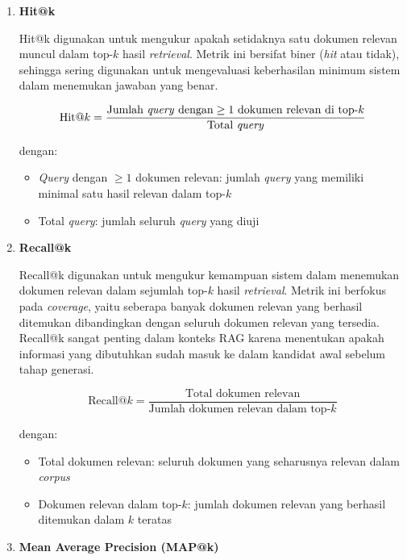 \begin{enumerate}
	\item \textbf{Hit@k}

	Hit@k digunakan untuk mengukur apakah setidaknya satu dokumen relevan muncul dalam top-$k$ hasil \textit{retrieval}. Metrik ini bersifat biner (\textit{hit} atau tidak), sehingga sering digunakan untuk mengevaluasi keberhasilan minimum sistem dalam menemukan jawaban yang benar.

	\begin{equation}
		\text{Hit@}k = \frac{\text{Jumlah \textit{query} dengan} \geq 1 \text{ dokumen relevan di top-}k}{\text{Total \textit{query}}}
	\end{equation}

	dengan:
	\begin{itemize}
		\item \textit{Query} dengan $\geq 1$ dokumen relevan: jumlah \textit{query} yang memiliki minimal satu hasil relevan dalam top-$k$
		\item Total \textit{query}: jumlah seluruh \textit{query} yang diuji
	\end{itemize}

	\item \textbf{Recall@k}

	Recall@k digunakan untuk mengukur kemampuan sistem dalam menemukan dokumen relevan dalam sejumlah top-$k$ hasil \textit{retrieval}. Metrik ini berfokus pada \textit{coverage}, yaitu seberapa banyak dokumen relevan yang berhasil ditemukan dibandingkan dengan seluruh dokumen relevan yang tersedia. Recall@k sangat penting dalam konteks RAG karena menentukan apakah informasi yang dibutuhkan sudah masuk ke dalam kandidat awal sebelum tahap generasi.

	\begin{equation}
		\text{Recall@}k = \frac{\text{Total dokumen relevan}}{\text{Jumlah dokumen relevan dalam top-}k}
	\end{equation}

	dengan:
	\begin{itemize}
		\item Total dokumen relevan: seluruh dokumen yang seharusnya relevan dalam \textit{corpus}
		\item Dokumen relevan dalam top-$k$: jumlah dokumen relevan yang berhasil ditemukan dalam $k$ teratas
	\end{itemize}

	\item \textbf{Mean Average Precision (MAP@k)}


\end{enumerate}
